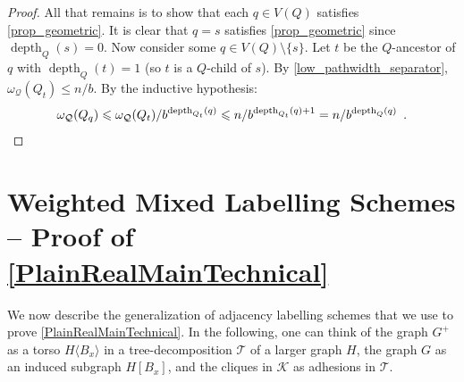 \documentclass{patmorin}
\renewcommand{\le}{\leqslant}
\newcommand{\torso}[2]{{#1}\langle{#2}\rangle}
\DeclareMathOperator{\depth}{depth}
\begin{document}
\begin{proof}


    All that remains is to show that each $q\in V(Q)$ satisfies \ref{prop_geometric}.  It is clear that $q=s$ satisfies \ref{prop_geometric} since $\depth_Q(s)=0$.  Now consider some $q\in V(Q)\setminus\{s\}$.  Let $t$ be the $Q$-ancestor of $q$ with $\depth_{Q}(t)=1$ (so $t$ is a $Q$-child of $s$). By \cref{low_pathwidth_separator}, $\omega_{\mathcal{Q}}(Q_{t})\le n/b$. By the inductive hypothesis:
    \[
       \omega_{\mathcal{Q}}(Q_{q})
       \le  \omega_{\mathcal{Q}}(Q_{t})/b^{\depth_{Q_{t}}(q)}
       \le n/b^{\depth_{Q_{t}}(q)+1} = n/b^{\depth_{Q}(q)} \enspace . \qedhere
    \]
  \end{proof}



  \section{Weighted Mixed Labelling Schemes -- Proof of \cref{PlainRealMainTechnical}}
  \label{weighted_mixed_section}

We now describe the generalization of adjacency labelling schemes that we use to prove \cref{PlainRealMainTechnical}.  In the following, one can think of the graph $G^+$ as a torso $\torso{H}{B_x}$ in a tree-decomposition $\mathcal{T}$ of a larger graph $H$, the graph $G$ as an induced subgraph $H[B_x]$, and the cliques in $\mathcal{K}$ as adhesions in $\mathcal{T}$.
\end{document}
